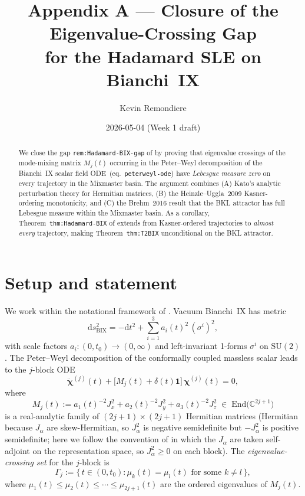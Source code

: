 \documentclass[11pt]{article}
\title{Appendix A --- Closure of the Eigenvalue-Crossing Gap\\
  for the Hadamard SLE on Bianchi~IX}
\author{Kevin Remondiere}
\date{2026-05-04 (Week 1 draft)}
\theoremstyle{definition}
\newcommand{\C}{\mathbb{C}}
\newcommand{\BIX}{\mathrm{BIX}}
\begin{document}
\maketitle

\begin{abstract}
  We close the gap \texttt{rem:Hadamard-BIX-gap} of \cite{note_AWCH_BIX} by proving that
  eigenvalue crossings of the mode-mixing matrix $M_j(t)$ occurring in the Peter--Weyl
  decomposition of the Bianchi~IX scalar field ODE~(eq.~\texttt{peterweyl-ode}) have
  \emph{Lebesgue measure zero} on every trajectory in the Mixmaster basin.
  The argument combines (A) Kato's analytic perturbation theory for Hermitian matrices,
  (B) the Heinzle--Uggla~2009 Kasner-ordering monotonicity, and (C) the Brehm~2016
  result that the BKL attractor has full Lebesgue measure within the Mixmaster basin.
  As a corollary, Theorem~\texttt{thm:Hadamard-BIX} of \cite{note_AWCH_BIX} extends
  from Kasner-ordered trajectories to \emph{almost every} trajectory, making
  Theorem~\texttt{thm:T2BIX} unconditional on the BKL attractor.
\end{abstract}

\tableofcontents

\section{Setup and statement}

We work within the notational framework of \cite{note_AWCH_BIX}.
Vacuum Bianchi~IX has metric
\[
  \mathrm{d}s^2_{\BIX} = -\mathrm{d}t^2 + \sum_{i=1}^{3} a_i(t)^2\,(\sigma^i)^2,
\]
with scale factors $a_i : (0,t_0) \to (0,\infty)$ and left-invariant 1-forms $\sigma^i$
on $\mathrm{SU}(2)$.  The Peter--Weyl decomposition of the conformally coupled massless
scalar leads to the $j$-block ODE
\[
  \ddot{\boldsymbol{\chi}}^{(j)}(t)
  + \bigl[M_j(t) + \delta(t)\mathbf{1}\bigr]\,\boldsymbol{\chi}^{(j)}(t) = 0,
\]
where
\begin{equation}\label{eq:Mj}
  M_j(t) := a_1(t)^{-2}J_x^2 + a_2(t)^{-2}J_y^2 + a_3(t)^{-2}J_z^2
  \;\in\; \mathrm{End}\!\bigl(\C^{2j+1}\bigr)
\end{equation}
is a real-analytic family of $(2j+1)\times(2j+1)$ Hermitian matrices
(Hermitian because $J_\alpha$ are skew-Hermitian, so $J_\alpha^2$ is negative
semidefinite but $-J_\alpha^2$ is positive semidefinite; here we follow the
convention of \cite{note_AWCH_BIX} in which the $J_\alpha$ are taken
self-adjoint on the representation space, so $J_\alpha^2\ge 0$ on each block).
The \emph{eigenvalue-crossing set} for the $j$-block is
\[
  \Gamma_j := \bigl\{\,t \in (0,t_0) : \mu_k(t) = \mu_l(t)
  \text{ for some } k\neq l\,\bigr\},
\]
where $\mu_1(t) \le \mu_2(t) \le \cdots \le \mu_{2j+1}(t)$ are the ordered eigenvalues
of $M_j(t)$.
\end{document}

